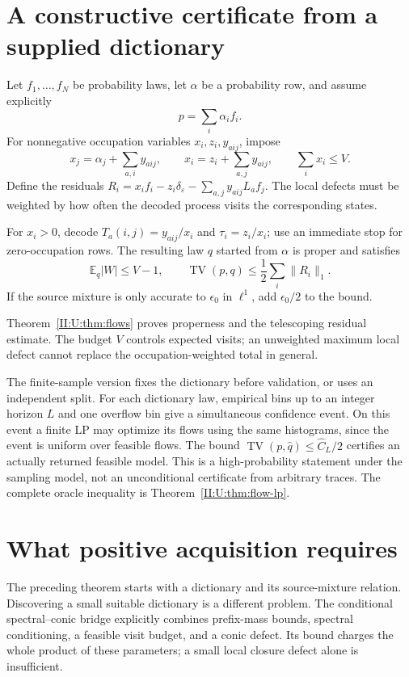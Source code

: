 \section{A constructive certificate from a supplied dictionary}
Let $f_1,\ldots,f_N$ be probability laws, let $\alpha$ be a probability
row, and assume explicitly
\[
 p=\sum_i\alpha_i f_i.
\]
For nonnegative occupation variables $x_i,z_i,y_{aij}$, impose
\[
 x_j=\alpha_j+\sum_{a,i}y_{aij},\qquad
 x_i=z_i+\sum_{a,j}y_{aij},\qquad \sum_i x_i\le V.
\]
Define the residuals
$R_i=x_if_i-z_i\delta_\varepsilon-\sum_{a,j}y_{aij}L_af_j$.
The local defects must be weighted by how often the decoded process
visits the corresponding states.

\begin{theorem}
For $x_i>0$, decode $T_a(i,j)=y_{aij}/x_i$ and
$\tau_i=z_i/x_i$; use an immediate stop for zero-occupation rows.
The resulting law $q$ started from $\alpha$ is proper and satisfies
\[
 \mathbb E_q|W|\le V-1,\qquad
 \operatorname{TV}(p,q)\le\frac12\sum_i\|R_i\|_1.
\]
If the source mixture is only accurate to $\epsilon_0$ in $\ell^1$,
add $\epsilon_0/2$ to the bound.
\end{theorem}
Theorem~\ref{II:U:thm:flows} proves properness and the telescoping residual
estimate. The budget $V$ controls expected visits; an unweighted maximum
local defect cannot replace the occupation-weighted total in general.

The finite-sample version fixes the dictionary before validation, or uses
an independent split. For each dictionary law, empirical bins up to an
integer horizon $L$ and one overflow bin give a simultaneous confidence
event. On this event a finite LP may optimize its flows using the same
histograms, since the event is uniform over feasible flows. The bound
$\operatorname{TV}(p,\widehat q)\le\widehat C_L/2$ certifies an actually
returned feasible model. This is a high-probability statement under the
sampling model, not an unconditional certificate from arbitrary traces.
The complete oracle inequality is Theorem~\ref{II:U:thm:flow-lp}.

\section{What positive acquisition requires}
The preceding theorem starts with a dictionary and its source-mixture
relation. Discovering a small suitable dictionary is a different problem.
The conditional spectral--conic bridge explicitly combines prefix-mass
bounds, spectral conditioning, a feasible visit budget, and a conic defect.
Its bound charges the whole product of these parameters; a small local
closure defect alone is insufficient.

